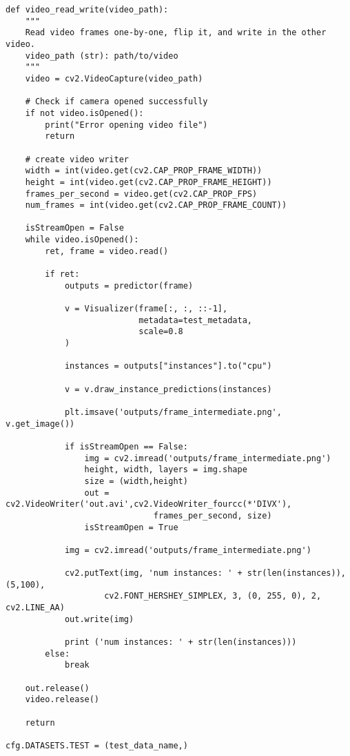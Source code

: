 \label{lst:inferens_retinanet}
\begin{verbatim}
def video_read_write(video_path):
    """
    Read video frames one-by-one, flip it, and write in the other video.
    video_path (str): path/to/video
    """
    video = cv2.VideoCapture(video_path)
    
    # Check if camera opened successfully
    if not video.isOpened(): 
        print("Error opening video file")
        return
    
    # create video writer
    width = int(video.get(cv2.CAP_PROP_FRAME_WIDTH))
    height = int(video.get(cv2.CAP_PROP_FRAME_HEIGHT))
    frames_per_second = video.get(cv2.CAP_PROP_FPS)
    num_frames = int(video.get(cv2.CAP_PROP_FRAME_COUNT))
    
    isStreamOpen = False
    while video.isOpened():
        ret, frame = video.read()
        
        if ret:
            outputs = predictor(frame)

            v = Visualizer(frame[:, :, ::-1],
                           metadata=test_metadata, 
                           scale=0.8
            )

            instances = outputs["instances"].to("cpu")

            v = v.draw_instance_predictions(instances)

            plt.imsave('outputs/frame_intermediate.png', v.get_image())

            if isStreamOpen == False:
                img = cv2.imread('outputs/frame_intermediate.png')
                height, width, layers = img.shape
                size = (width,height)
                out = cv2.VideoWriter('out.avi',cv2.VideoWriter_fourcc(*'DIVX'),
                		      frames_per_second, size)
                isStreamOpen = True

            img = cv2.imread('outputs/frame_intermediate.png')

            cv2.putText(img, 'num instances: ' + str(len(instances)), (5,100),
            		cv2.FONT_HERSHEY_SIMPLEX, 3, (0, 255, 0), 2, cv2.LINE_AA)
            out.write(img)

            print ('num instances: ' + str(len(instances)))
        else:
            break
    
    out.release()
    video.release()
    
    return

cfg.DATASETS.TEST = (test_data_name,)


\end{verbatim}
